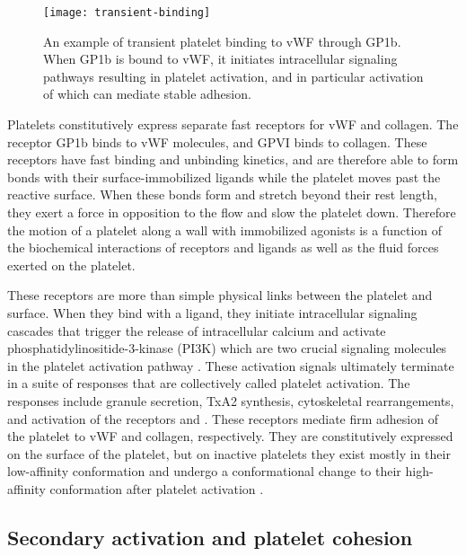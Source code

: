 \begin{figure}
  \centering
  \texttt{[image: transient-binding]}
  \caption[An example of transient platelet binding to vWF through
  GP1b.]{An example of transient platelet binding to vWF through
    GP1b. When GP1b is bound to vWF, it initiates intracellular
    signaling pathways resulting in platelet activation, and in
    particular activation of  which can mediate stable
    adhesion.}
  \label{fig:transient-binding}
\end{figure}

Platelets constitutively express separate fast receptors for vWF and
collagen. The receptor GP1b binds to vWF molecules, and GPVI binds to
collagen. These receptors have fast binding and unbinding kinetics,
and are therefore able to form bonds with their surface-immobilized
ligands while the platelet moves past the reactive surface. When these
bonds form and stretch beyond their rest length, they exert a
force in opposition to the flow and slow the platelet down. Therefore
the motion of a platelet along a wall with immobilized agonists is a
function of the biochemical interactions of receptors and ligands as
well as the fluid forces exerted on the platelet.
		
These receptors are more than simple physical links between the
platelet and surface. When they bind with a ligand, they initiate
intracellular signaling cascades that trigger the release of
intracellular calcium and activate phosphatidylinositide-3-kinase
(PI3K) which are two crucial signaling molecules in the platelet
activation pathway \cite{Bye2016,Du2007,Senis2014}. These activation
signals ultimately terminate in a suite of responses that are
collectively called platelet activation. The responses include granule
secretion, TxA2 synthesis, cytoskeletal rearrangements, and activation
of the receptors  and . These receptors
mediate firm adhesion of the platelet to vWF and collagen,
respectively. They are constitutively expressed on the surface of the
platelet, but on inactive platelets they exist mostly in their
low-affinity conformation and undergo a conformational change to their
high-affinity conformation after platelet activation
\cite{Qiu2015,Shattil1998,Shattil2010}.

\subsection{Secondary activation and platelet cohesion}
\label{sec:second-wave-activ}

